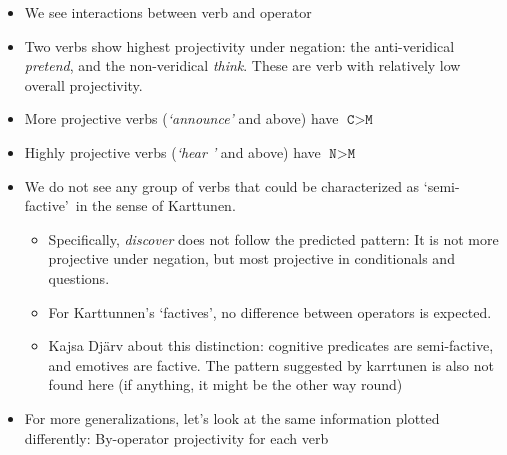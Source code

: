 \documentclass[10pt]{article}\usepackage[]{graphicx}\usepackage[]{color}
\begin{document}
\begin{itemize}
  \item We see interactions between verb and operator

  \item Two verbs show highest projectivity under negation: the anti-veridical \emph{pretend}, and the non-veridical \emph{think}. These are verb with relatively low overall projectivity.

  \item More projective verbs (\emph{\lq announce\rq} and above) have $\texttt{C} > \texttt{M}$

  \item Highly projective verbs (\emph{\lq hear \rq} and above) have  $\texttt{N} > \texttt{M}$

  \item We do not see any group of verbs that could be characterized as \lq semi-factive\rq\ in the sense of Karttunen.
  \begin{itemize}
    \item Specifically, \emph{discover} does not follow the predicted pattern: It is not more projective under negation, but most projective in conditionals and questions.
    \item For Karttunnen's \lq factives\rq, no difference between operators is expected.
    \item Kajsa Djärv about this distinction: cognitive predicates are semi-factive, and emotives are factive. The pattern suggested by karrtunen is also not found here (if anything, it might be the other way round)
  \end{itemize}

  \item For more generalizations, let's look at the same information plotted differently: By-operator projectivity for each verb
\end{itemize}
\end{document}
